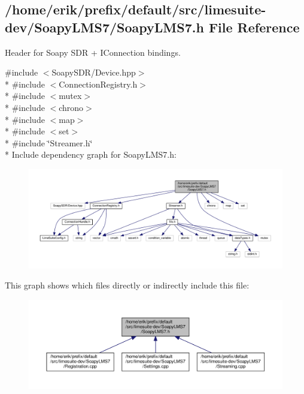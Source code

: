 \subsection{/home/erik/prefix/default/src/limesuite-\/dev/\+Soapy\+L\+M\+S7/\+Soapy\+L\+M\+S7.h File Reference}
\label{SoapyLMS7_8h}


Header for Soapy S\+DR + I\+Connection bindings.  


{\ttfamily \#include $<$Soapy\+S\+D\+R/\+Device.\+hpp$>$}\\*
{\ttfamily \#include $<$Connection\+Registry.\+h$>$}\\*
{\ttfamily \#include $<$mutex$>$}\\*
{\ttfamily \#include $<$chrono$>$}\\*
{\ttfamily \#include $<$map$>$}\\*
{\ttfamily \#include $<$set$>$}\\*
{\ttfamily \#include \char`\"{}Streamer.\+h\char`\"{}}\\*
Include dependency graph for Soapy\+L\+M\+S7.\+h\+:
\nopagebreak
\begin{figure}[H]
\begin{center}
\leavevmode
\includegraphics[width=350pt]{d0/d94/SoapyLMS7_8h__incl}
\end{center}
\end{figure}
This graph shows which files directly or indirectly include this file\+:
\nopagebreak
\begin{figure}[H]
\begin{center}
\leavevmode
\includegraphics[width=350pt]{d6/d61/SoapyLMS7_8h__dep__incl}
\end{center}
\end{figure}
